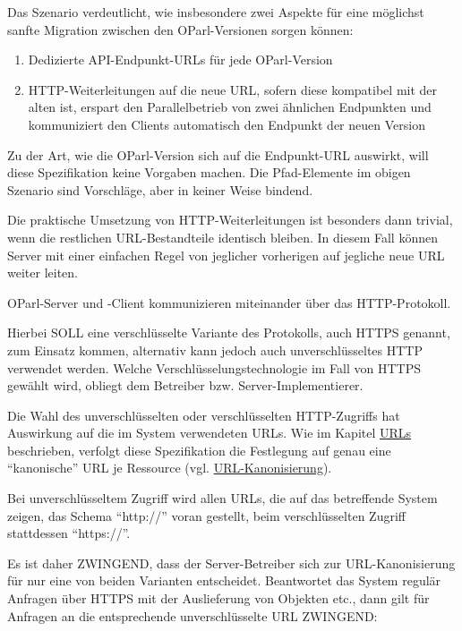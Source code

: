 \documentclass[,a4paper]{article}
\begin{document}
Das Szenario verdeutlicht, wie insbesondere zwei Aspekte für eine
möglichst sanfte Migration zwischen den OParl-Versionen sorgen können:

\begin{enumerate}
\def\labelenumi{\arabic{enumi}.}
\item
  Dedizierte API-Endpunkt-URLs für jede OParl-Version
\item
  HTTP-Weiterleitungen auf die neue URL, sofern diese kompatibel mit der
  alten ist, erspart den Parallelbetrieb von zwei ähnlichen Endpunkten
  und kommuniziert den Clients automatisch den Endpunkt der neuen
  Version
\end{enumerate}

Zu der Art, wie die OParl-Version sich auf die Endpunkt-URL auswirkt,
will diese Spezifikation keine Vorgaben machen. Die Pfad-Elemente im
obigen Szenario sind Vorschläge, aber in keiner Weise bindend.

Die praktische Umsetzung von HTTP-Weiterleitungen ist besonders dann
trivial, wenn die restlichen URL-Bestandteile identisch bleiben. In
diesem Fall können Server mit einer einfachen Regel von jeglicher
vorherigen auf jegliche neue URL weiter leiten.


OParl-Server und -Client kommunizieren miteinander über das
HTTP-Protokoll.

Hierbei SOLL eine verschlüsselte Variante des Protokolls, auch HTTPS
genannt, zum Einsatz kommen, alternativ kann jedoch auch
unverschlüsseltes HTTP verwendet werden. Welche
Verschlüsselungstechnologie im Fall von HTTPS gewählt wird, obliegt dem
Betreiber bzw. Server-Implementierer.

Die Wahl des unverschlüsselten oder verschlüsselten HTTP-Zugriffs hat
Auswirkung auf die im System verwendeten URLs. Wie im Kapitel
\hyperref[urls]{URLs} beschrieben, verfolgt diese Spezifikation die
Festlegung auf genau eine ``kanonische'' URL je Ressource (vgl.
\hyperref[urlux5fkanonisierung]{URL-Kanonisierung}).

Bei unverschlüsseltem Zugriff wird allen URLs, die auf das betreffende
System zeigen, das Schema ``http://'' voran gestellt, beim
verschlüsselten Zugriff stattdessen ``https://''.

Es ist daher ZWINGEND, dass der Server-Betreiber sich zur
URL-Kanonisierung für nur eine von beiden Varianten entscheidet.
Beantwortet das System regulär Anfragen über HTTPS mit der Auslieferung
von Objekten etc., dann gilt für Anfragen an die entsprechende
unverschlüsselte URL ZWINGEND:
\end{document}
